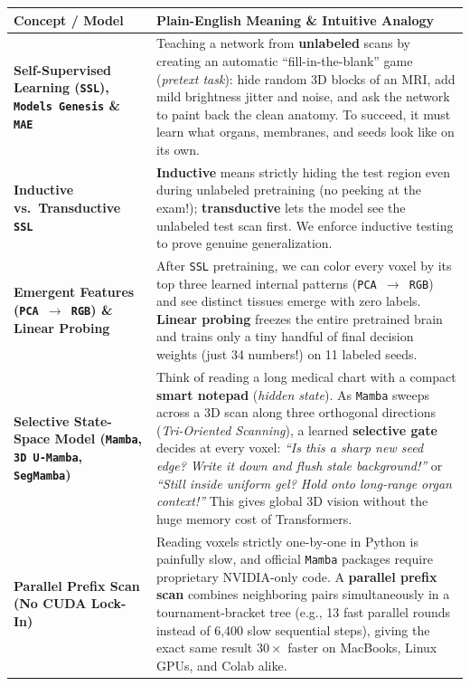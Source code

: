 \documentclass[10.5pt,a4paper]{article}
\begin{document}
\begin{table}[H]
\centering
\scriptsize
\renewcommand{\arraystretch}{1.18}
\begin{tabularx}{\textwidth}{L{3.55cm} Y}
\toprule
{}
\textbf{Concept / Model} & \textbf{Plain-English Meaning \& Intuitive Analogy} \\
\midrule
\textbf{Self-Supervised Learning (\texttt{SSL}), \texttt{Models Genesis} \& \texttt{MAE}} & Teaching a network from \textbf{unlabeled} scans by creating an automatic ``fill-in-the-blank'' game (\emph{pretext task}): hide random 3D blocks of an MRI, add mild brightness jitter and noise, and ask the network to paint back the clean anatomy. To succeed, it must learn what organs, membranes, and seeds look like on its own. \\
\textbf{Inductive vs.\ Transductive \texttt{SSL}} & \textbf{Inductive} means strictly hiding the test region even during unlabeled pretraining (no peeking at the exam!); \textbf{transductive} lets the model see the unlabeled test scan first. We enforce inductive testing to prove genuine generalization. \\
\textbf{Emergent Features (\texttt{PCA $\to$ RGB}) \& Linear Probing} & After \texttt{SSL} pretraining, we can color every voxel by its top three learned internal patterns (\texttt{PCA $\to$ RGB}) and see distinct tissues emerge with zero labels. \textbf{Linear probing} freezes the entire pretrained brain and trains only a tiny handful of final decision weights (just 34 numbers!) on 11 labeled seeds. \\
\textbf{Selective State-Space Model (\texttt{Mamba}, \texttt{3D U-Mamba}, \texttt{SegMamba})} & Think of reading a long medical chart with a compact \textbf{smart notepad} (\emph{hidden state}). As \texttt{Mamba} sweeps across a 3D scan along three orthogonal directions (\emph{Tri-Oriented Scanning}), a learned \textbf{selective gate} decides at every voxel: \emph{``Is this a sharp new seed edge? Write it down and flush stale background!''} or \emph{``Still inside uniform gel? Hold onto long-range organ context!''} This gives global 3D vision without the huge memory cost of Transformers. \\
\textbf{Parallel Prefix Scan (No CUDA Lock-In)} & Reading voxels strictly one-by-one in Python is painfully slow, and official \texttt{Mamba} packages require proprietary NVIDIA-only code. A \textbf{parallel prefix scan} combines neighboring pairs simultaneously in a tournament-bracket tree (e.g., 13 fast parallel rounds instead of 6,400 slow sequential steps), giving the exact same result $30\times$ faster on MacBooks, Linux GPUs, and Colab alike. \\

\end{tabularx}
\end{table}
\end{document}
